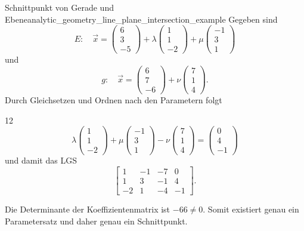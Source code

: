 \begin{ExampleBox}{Schnittpunkt von Gerade und Ebene}{analytic_geometry_line_plane_intersection_example}
  Gegeben sind
  \[
    E:\quad
    \vec x=\begin{pmatrix}6\\3\\-5\end{pmatrix}
      +\lambda\begin{pmatrix}1\\1\\-2\end{pmatrix}
      +\mu\begin{pmatrix}-1\\3\\1\end{pmatrix}
  \]
  und
  \[
    g:\quad
    \vec x=\begin{pmatrix}6\\7\\-6\end{pmatrix}
      +\nu\begin{pmatrix}7\\1\\4\end{pmatrix}.
  \]
  Durch Gleichsetzen und Ordnen nach den Parametern folgt
  \begin{ClozeArea}[34]{12}
    \[
      \lambda\begin{pmatrix}1\\1\\-2\end{pmatrix}
      +\mu\begin{pmatrix}-1\\3\\1\end{pmatrix}
      -\nu\begin{pmatrix}7\\1\\4\end{pmatrix}
      =\begin{pmatrix}0\\4\\-1\end{pmatrix}
    \]
    und damit das LGS
    \[
      \left[
        \begin{array}{rrr|r}
          1&-1&-7&0\\
          1& 3&-1&4\\
         -2& 1&-4&-1
        \end{array}
      \right].
    \]
  \end{ClozeArea}
  Die Determinante der Koeffizientenmatrix ist $-66\ne0$. Somit existiert genau
  ein Parametersatz und daher genau ein Schnittpunkt.
\end{ExampleBox}

